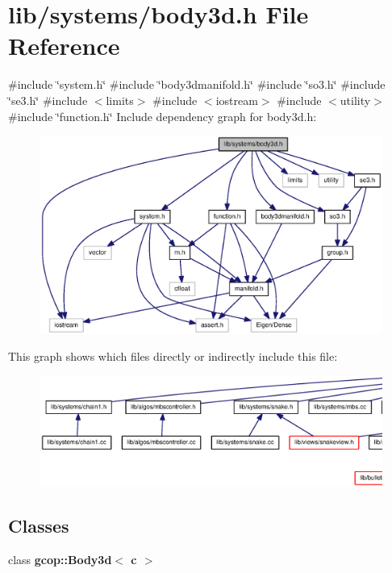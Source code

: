 \section{lib/systems/body3d.h \-File \-Reference}
\label{body3d_8h}
{\ttfamily \#include \char`\"{}system.\-h\char`\"{}}\*
{\ttfamily \#include \char`\"{}body3dmanifold.\-h\char`\"{}}\*
{\ttfamily \#include \char`\"{}so3.\-h\char`\"{}}\*
{\ttfamily \#include \char`\"{}se3.\-h\char`\"{}}\*
{\ttfamily \#include $<$limits$>$}\*
{\ttfamily \#include $<$iostream$>$}\*
{\ttfamily \#include $<$utility$>$}\*
{\ttfamily \#include \char`\"{}function.\-h\char`\"{}}\*
\-Include dependency graph for body3d.\-h\-:\nopagebreak
\begin{figure}[H]
\begin{center}
\leavevmode
\includegraphics[width=350pt]{body3d_8h__incl}
\end{center}
\end{figure}
\-This graph shows which files directly or indirectly include this file\-:
\nopagebreak
\begin{figure}[H]
\begin{center}
\leavevmode
\includegraphics[width=350pt]{body3d_8h__dep__incl}
\end{center}
\end{figure}
\subsection*{\-Classes}
\begin{DoxyCompactItemize}
\item 
class {\bf gcop\-::\-Body3d$<$ c $>$}
\end{DoxyCompactItemize}
